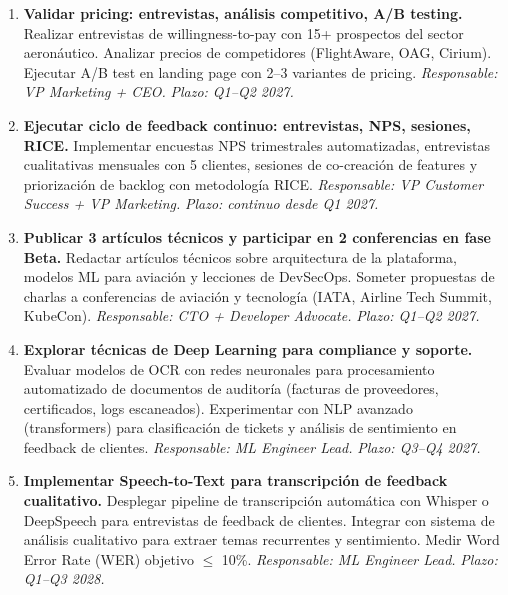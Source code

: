 ﻿\documentclass[11pt, letterpaper]{article}
\begin{document}
\begin{enumerate}[leftmargin=1.5cm, label=\textbf{OT\arabic*}, itemsep=2pt, topsep=4pt]
    \item \textbf{Validar pricing: entrevistas, análisis competitivo, A/B testing.} Realizar entrevistas de willingness-to-pay con 15+ prospectos del sector aeronáutico. Analizar precios de competidores (FlightAware, OAG, Cirium). Ejecutar A/B test en landing page con 2--3 variantes de pricing. \textit{Responsable: VP Marketing + CEO.} \textit{Plazo: Q1--Q2 2027.}



    \item \textbf{Ejecutar ciclo de feedback continuo: entrevistas, NPS, sesiones, RICE.} Implementar encuestas NPS trimestrales automatizadas, entrevistas cualitativas mensuales con 5 clientes, sesiones de co-creación de features y priorización de backlog con metodología RICE. \textit{Responsable: VP Customer Success + VP Marketing.} \textit{Plazo: continuo desde Q1 2027.}



    \item \textbf{Publicar 3 artículos técnicos y participar en 2 conferencias en fase Beta.} Redactar artículos técnicos sobre arquitectura de la plataforma, modelos ML para aviación y lecciones de DevSecOps. Someter propuestas de charlas a conferencias de aviación y tecnología (IATA, Airline Tech Summit, KubeCon). \textit{Responsable: CTO + Developer Advocate.} \textit{Plazo: Q1--Q2 2027.}



    \item \textbf{Explorar técnicas de Deep Learning para compliance y soporte.} Evaluar modelos de OCR con redes neuronales para procesamiento automatizado de documentos de auditoría (facturas de proveedores, certificados, logs escaneados). Experimentar con NLP avanzado (transformers) para clasificación de tickets y análisis de sentimiento en feedback de clientes. \textit{Responsable: ML Engineer Lead.} \textit{Plazo: Q3--Q4 2027.}



    \item \textbf{Implementar Speech-to-Text para transcripción de feedback cualitativo.} Desplegar pipeline de transcripción automática con Whisper o DeepSpeech para entrevistas de feedback de clientes. Integrar con sistema de análisis cualitativo para extraer temas recurrentes y sentimiento. Medir Word Error Rate (WER) objetivo $\leq$ 10\%. \textit{Responsable: ML Engineer Lead.} \textit{Plazo: Q1--Q3 2028.}

\end{enumerate}
\end{document}
